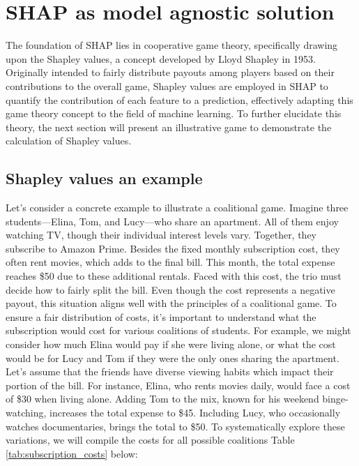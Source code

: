 \documentclass[12pt]{article}
\begin{document}
\section{SHAP as model agnostic solution}
The foundation of SHAP lies in cooperative game theory, specifically drawing upon the Shapley values, a concept developed by Lloyd Shapley in 1953. Originally intended to fairly distribute payouts among players based on their contributions to the overall game, Shapley values are employed in SHAP to quantify the contribution of each feature to a prediction, effectively adapting this game theory concept to the field of machine learning. To further elucidate this theory, the next section will present an illustrative game to demonstrate the calculation of Shapley values.
	\subsection{Shapley values an example}
    Let's consider a concrete example to illustrate a coalitional game.
	Imagine three students—Elina, Tom, and Lucy—who share an apartment. All of them enjoy watching TV, though their individual interest levels vary. Together, they subscribe to Amazon Prime. 
	Besides the fixed monthly subscription cost, they often rent movies, which adds to the final bill. This month, the total expense reaches \$50 due to these additional rentals. Faced with this cost, the trio must decide how to fairly split the bill. Even though the cost represents a negative payout, this situation aligns well with the principles of a coalitional game. To ensure a fair distribution of costs, it's important to understand what the subscription would cost for various coalitions of students. For example, we might consider how much Elina would pay if she were living alone, or what the cost would be for Lucy and Tom if they were the only ones sharing the apartment.
	Let's assume that the friends have diverse viewing habits which impact their portion of the bill. For instance, Elina, who rents movies daily, would face a cost of \$30 when living alone. Adding Tom to the mix, known for his weekend binge-watching, increases the total expense to \$45. Including Lucy, who occasionally watches documentaries, brings the total to \$50. To systematically explore these variations, we will compile the costs for all possible coalitions Table \ref{tab:subscription_costs} below:
\end{document}
